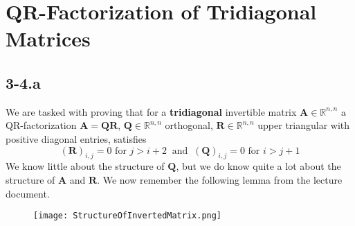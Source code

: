 \documentclass{article}
\begin{document}
\section*{QR-Factorization of Tridiagonal Matrices}

\subsection*{3-4.a} 
We are tasked with proving that for a \textbf{tridiagonal} invertible matrix $\mathbf{A} \in \mathbb{R}^{n,n}$ a QR-factorization $\mathbf{A}= \mathbf{Q}\mathbf{R}$, $\mathbf{Q}\in \mathbb{R}^{n,n}$ orthogonal, $\mathbf{R}\in \mathbb{R}^{n,n}$ upper triangular with positive diagonal entries, satisfies
\begin{equation*}
    \left(\mathbf{R}\right)_{i,j} = 0 \text{ for } j > i + 2 \:\text{ and }\: \left(\mathbf{Q}\right)_{i,j} = 0 \text{ for } i > j + 1
\end{equation*}
We know little about the structure of $\mathbf{Q}$, but we do know quite a lot about the structure of $\mathbf{A}$ and $\mathbf{R}$. We now remember the following lemma from the lecture document.

\begin{figure}[!hbt]
    \centering
\texttt{[image: StructureOfInvertedMatrix.png]}
\end{figure}
\end{document}
